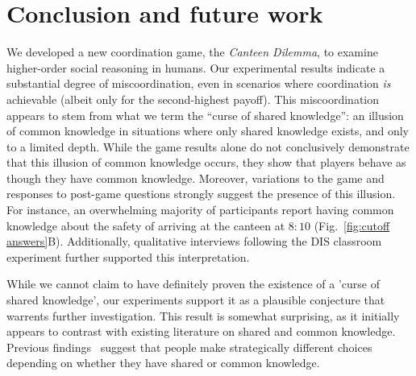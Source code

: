 \section{Conclusion and future work} \label{S:conclusion}
We developed a new coordination game, the \emph{Canteen Dilemma}, to examine higher-order social reasoning in humans. Our experimental results %
indicate a substantial degree of miscoordination, even in scenarios where coordination \emph{is} achievable (albeit only for the second-highest payoff). This miscoordination appears to stem from what we term the ``curse of shared knowledge'': an illusion of common knowledge in situations where only shared knowledge exists, and only to a limited depth. While the game results alone do not conclusively demonstrate that this illusion of common knowledge occurs, they show that players behave as though they have common knowledge. Moreover, variations to the game and responses to post-game questions strongly suggest the presence of this illusion. For instance, an overwhelming majority of participants report having common knowledge about the safety of arriving at the canteen at $8{:}10$ (Fig.~\ref{fig:cutoff answers}B). Additionally, qualitative interviews following the DIS classroom experiment further supported this interpretation. 

While we cannot claim to have definitely proven the existence of a 'curse of shared knowledge', our experiments support it as a plausible conjecture that warrents further investigation. This result is somewhat surprising, as it initially appears to contrast with existing literature on shared and common knowledge. 
Previous findings~\cite{lee2010rationales, thomas2014psychology, thomas2016recursive, thomas2018common, de2019common, de2019maimonides} suggest that people make strategically different choices depending on whether they have shared or common knowledge. 

